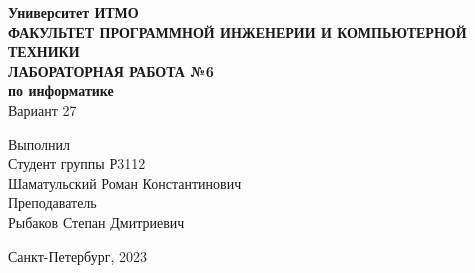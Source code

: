 
\thispagestyle{empty}
\begin{center}
\Large{\textbf{Университет ИТМО}}\\
\hfill \break
\textbf{ФАКУЛЬТЕТ ПРОГРАММНОЙ ИНЖЕНЕРИИ И КОМПЬЮТЕРНОЙ ТЕХНИКИ}\\
\vspace{6.5cm}
\textbf{ЛАБОРАТОРНАЯ РАБОТА №6}\\
\textbf{по информатике}\\
Вариант 27\\
\end{center}
\vspace{5.5cm}
\begin{flushright}
Выполнил\\
Студент группы Р3112\\
Шаматульский Роман Константинович\\
Преподаватель\\
Рыбаков Степан Дмитриевич
\end{flushright}
\vspace{2cm}
\begin{center}
    Санкт-Петербург, 2023
\end{center}

\newpage